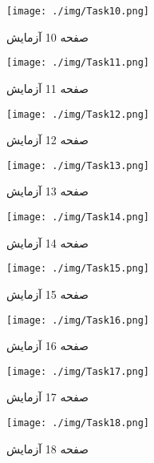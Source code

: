 {    %
    \begin{figure}[htpb]
        \centering
        \texttt{[image: ./img/Task10.png]}
        \caption{ صفحه 10 آزمایش }
        \label{fig:Task10}
    \end{figure}


    \begin{figure}[htpb]
        \centering
        \texttt{[image: ./img/Task11.png]}
        \caption{ صفحه 11 آزمایش }
        \label{fig:Task11}
    \end{figure}


    \begin{figure}[htpb]
        \centering
        \texttt{[image: ./img/Task12.png]}
        \caption{ صفحه 12 آزمایش }
        \label{fig:Task12}
    \end{figure}


    \begin{figure}[htpb]
        \centering
        \texttt{[image: ./img/Task13.png]}
        \caption{ صفحه 13 آزمایش }
        \label{fig:Task13}
    \end{figure}


    \begin{figure}[htpb]
        \centering
        \texttt{[image: ./img/Task14.png]}
        \caption{ صفحه 14 آزمایش }
        \label{fig:Task14}
    \end{figure}


    \begin{figure}[htpb]
        \centering
        \texttt{[image: ./img/Task15.png]}
        \caption{ صفحه 15 آزمایش }
        \label{fig:Task15}
    \end{figure}


    \begin{figure}[htpb]
        \centering
        \texttt{[image: ./img/Task16.png]}
        \caption{ صفحه 16 آزمایش }
        \label{fig:Task16}
    \end{figure}


    \begin{figure}[htpb]
        \centering
        \texttt{[image: ./img/Task17.png]}
        \caption{ صفحه 17 آزمایش }
        \label{fig:Task17}
    \end{figure}


    \begin{figure}[htpb]
        \centering
        \texttt{[image: ./img/Task18.png]}
        \caption{ صفحه 18 آزمایش }
        \label{fig:Task18}
    \end{figure}


}
